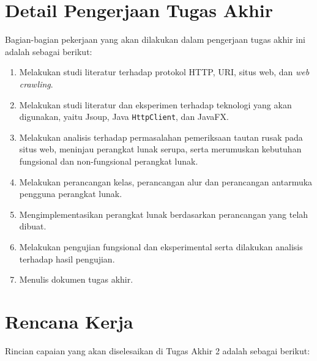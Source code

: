 \documentclass[a4paper,twoside]{article}
\begin{document}
\section{Detail Pengerjaan Tugas Akhir}
Bagian-bagian pekerjaan yang akan dilakukan dalam pengerjaan tugas akhir ini adalah sebagai berikut:

\begin{enumerate}
    
    \item Melakukan studi literatur terhadap protokol HTTP, URI, situs web, dan \textit{web crawling}.
    
    \item Melakukan studi literatur dan eksperimen terhadap teknologi yang akan digunakan, yaitu Jsoup, Java \texttt{HttpClient}, dan JavaFX.
    
    \item Melakukan analisis terhadap permasalahan pemeriksaan tautan rusak pada situs web, meninjau perangkat lunak serupa, serta merumuskan kebutuhan fungsional dan non-fungsional perangkat lunak.
    
    \item Melakukan perancangan kelas, perancangan alur dan perancangan antarmuka pengguna perangkat lunak.
    
    \item Mengimplementasikan perangkat lunak berdasarkan perancangan yang telah dibuat.
    
    \item Melakukan pengujian fungsional dan eksperimental serta dilakukan analisis terhadap hasil pengujian.
    
    \item Menulis dokumen tugas akhir.
\end{enumerate}


\section{Rencana Kerja}
Rincian capaian yang akan diselesaikan di Tugas Akhir 2 adalah sebagai berikut:
\end{document}

